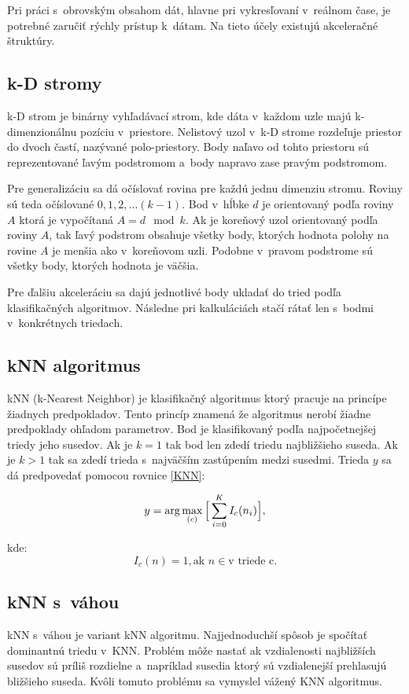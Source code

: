 Pri práci s~obrovským obsahom dát, hlavne pri vykresľovaní v~reálnom čase, je potrebné zaručiť rýchly prístup k~dátam. Na tieto účely existujú akceleračné štruktúry.

\subsection*{k-D stromy}
k-D strom je binárny vyhľadávací strom\cite{KDTrees}, kde dáta v~každom uzle majú k-dimenzionálnu pozíciu v~priestore. Nelistový uzol v~k-D strome rozdeľuje priestor do dvoch častí, nazývané polo-priestory. Body naľavo od tohto priestoru sú reprezentované ľavým podstromom a~body napravo zase pravým podstromom.

Pre generalizáciu sa dá očíslovať rovina pre každú jednu dimenziu stromu. Roviny sú teda očíslované $0, 1, 2, ... (k-1)$. Bod v~hĺbke $d$ je orientovaný podľa roviny $A$ ktorá je vypočítaná $A = d \mod k$. Ak je koreňový uzol orientovaný podľa roviny $A$, tak ľavý podstrom obsahuje všetky body, ktorých hodnota polohy na rovine $A$ je menšia ako v~koreňovom uzli. Podobne v~pravom podstrome sú všetky body, ktorých hodnota je väčšia.

Pre ďalšiu akceleráciu sa dajú jednotlivé body ukladať do tried podľa klasifikačných algoritmov. Následne pri kalkuláciách stačí rátať len s~bodmi v~konkrétnych triedach.

\subsection*{kNN algoritmus}
kNN (k-Nearest Neighbor) je klasifikačný algoritmus \cite{KNNSearch} ktorý pracuje na princípe žiadnych predpokladov. Tento princíp znamená že algoritmus nerobí žiadne predpoklady ohľadom parametrov. Bod je klasifikovaný podľa najpočetnejšej triedy jeho susedov. Ak je $k = 1$ tak bod len zdedí triedu najbližšieho suseda. Ak je $k > 1$ tak sa zdedí trieda s~najväčším zastúpením medzi susedmi. Trieda $y$ sa dá predpovedať pomocou rovnice \ref{KNN}:

\begin{equation} \label{KNN}
    y = \arg \max_{(c)}\Big{[} \sum^{K}_{i=0} I_c(n_i) \Big{]},
\end{equation}

\noindent kde:
$$I_c(n) = 1, \text{ak } n \in \text{v triede c.}$$

\subsection*{kNN s~váhou}
kNN s~váhou je variant kNN algoritmu. Najjednoduchší spôsob je spočítať dominantnú triedu v~KNN. Problém môže nastať ak vzdialenosti najbližších susedov sú príliš rozdielne a~napríklad susedia ktorý sú vzdialenejší prehlasujú bližšieho suseda. Kvôli tomuto problému sa vymyslel vážený KNN algoritmus.

